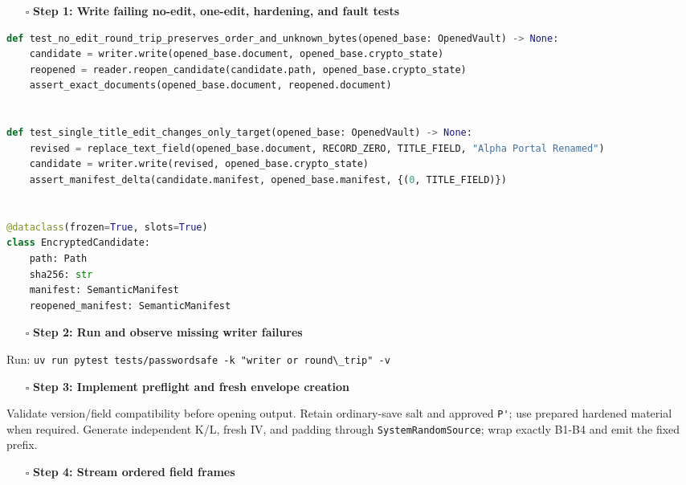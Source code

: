 \documentclass[
  letterpaper,
]{article}
\newcommand{\passthrough}[1]{#1}
\providecommand{\tightlist}{%
  \setlength{\itemsep}{0pt}\setlength{\parskip}{0pt}}
\begin{document}
\begin{itemize}
\tightlist
\item[$\square$]
  \textbf{Step 1: Write failing no-edit, one-edit, hardening, and fault tests}
\end{itemize}

\begin{lstlisting}[language=Python]
def test_no_edit_round_trip_preserves_order_and_unknown_bytes(opened_base: OpenedVault) -> None:
    candidate = writer.write(opened_base.document, opened_base.crypto_state)
    reopened = reader.reopen_candidate(candidate.path, opened_base.crypto_state)
    assert_exact_documents(opened_base.document, reopened.document)


def test_single_title_edit_changes_only_target(opened_base: OpenedVault) -> None:
    revised = replace_text_field(opened_base.document, RECORD_ZERO, TITLE_FIELD, "Alpha Portal Renamed")
    candidate = writer.write(revised, opened_base.crypto_state)
    assert_manifest_delta(candidate.manifest, opened_base.manifest, {(0, TITLE_FIELD)})


@dataclass(frozen=True, slots=True)
class EncryptedCandidate:
    path: Path
    sha256: str
    manifest: SemanticManifest
    reopened_manifest: SemanticManifest
\end{lstlisting}

\begin{itemize}
\tightlist
\item[$\square$]
  \textbf{Step 2: Run and observe missing writer failures}
\end{itemize}

Run: \passthrough{\lstinline!uv run pytest tests/passwordsafe -k "writer or round\_trip" -v!}

\begin{itemize}
\tightlist
\item[$\square$]
  \textbf{Step 3: Implement preflight and fresh envelope creation}
\end{itemize}

Validate version/field compatibility before opening output. Retain ordinary-save salt and approved
\passthrough{\lstinline!P'!}; use prepared hardened material when required. Generate independent K/L, fresh IV, and
padding through \nolinkurl{SystemRandomSource}; wrap exactly B1-B4 and emit the fixed prefix.

\begin{itemize}
\tightlist
\item[$\square$]
  \textbf{Step 4: Stream ordered field frames}
\end{itemize}
\end{document}

